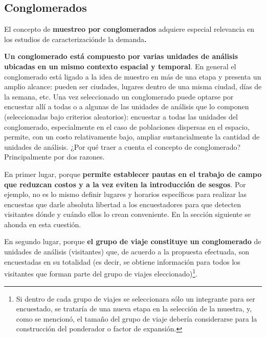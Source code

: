 \documentclass[
]{book}
\begin{document}
\hypertarget{conglomerados}{%
\subsection{Conglomerados}\label{conglomerados}}

El concepto de \textbf{muestreo por conglomerados} adquiere especial relevancia en los estudios de caracterizaciónde la demanda\textbf{.}

\textbf{Un conglomerado está compuesto por varias unidades de análisis ubicadas en un mismo contexto espacial y temporal}. En general el conglomerado está ligado a la idea de muestro en más de una etapa y presenta un amplio alcance: pueden ser ciudades, lugares dentro de una misma ciudad, días de la semana, etc. Una vez seleccionado un conglomerado puede optarse por encuestar allí a todas o a algunas de las unidades de análisis que lo componen (seleccionadas bajo criterios aleatorios): encuestar a todas las unidades del conglomerado, especialmente en el caso de poblaciones dispersas en el espacio, permite, con un costo relativamente bajo, ampliar sustancialmente la cantidad de unidades de análisis. ¿Por qué traer a cuenta el concepto de conglomerado? Principalmente por dos razones.

En primer lugar, porque \textbf{permite establecer pautas en el trabajo de campo que reduzcan costos y a la vez eviten la introducción de sesgos}. Por ejemplo, no es lo mismo definir lugares y horarios específicos para realizar las encuestas que darle absoluta libertad a los encuestadores para que detecten visitantes dónde y cuándo ellos lo crean conveniente. En la sección siguiente se ahonda en esta cuestión.

En segundo lugar, porque \textbf{el grupo de viaje constituye un conglomerado} de unidades de análisis (visitantes) que, de acuerdo a la propuesta efectuada, son encuestadas en su totalidad (es decir, se obtiene información para todos los visitantes que forman parte del grupo de viajes eleccionado)\footnote{Si dentro de cada grupo de viajes se seleccionara sólo un integrante para ser encuestado, se trataría de una nueva etapa en la selección de la muestra, y, como se mencionó, el tamaño del grupo de viaje debería considerarse para la construcción del ponderador o factor de expansión.}.
\end{document}

